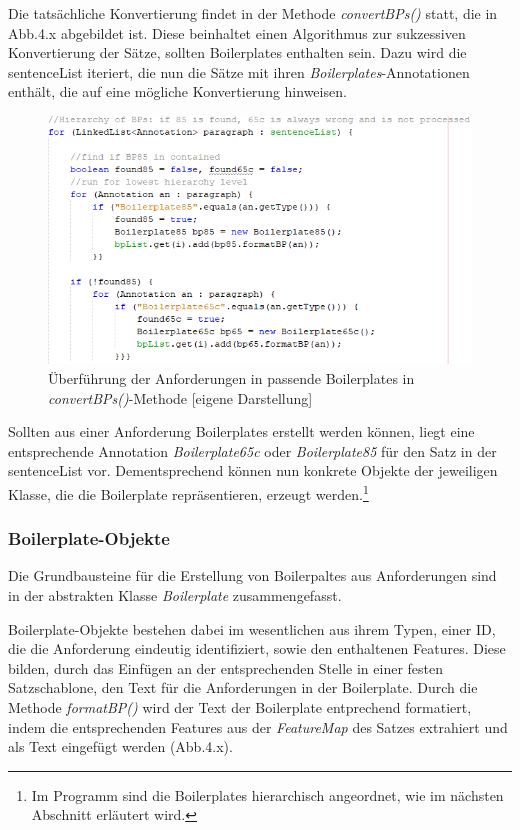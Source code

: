 \documentclass[12pt]{report}
\begin{document}
Die tatsächliche Konvertierung findet in der Methode \textit{convertBPs()} statt, die in Abb.4.x abgebildet ist.  Diese beinhaltet einen Algorithmus zur sukzessiven Konvertierung der Sätze, sollten Boilerplates enthalten sein. Dazu wird die sentenceList iteriert, die nun die Sätze mit ihren \textit{Boilerplates}-Annotationen enthält, die auf eine mögliche Konvertierung hinweisen. 

\begin{figure}[h!]
\begin{center}
\includegraphics[scale=1]{Bilder/BoilerplateHandler-convertBPs.png}
\caption{Überführung der Anforderungen in passende Boilerplates in \textit{convertBPs()}-Methode [eigene Darstellung]}
\end{center}
\end{figure}

Sollten aus einer Anforderung Boilerplates erstellt werden können, liegt eine entsprechende Annotation \textit{Boilerplate65c} oder \textit{Boilerplate85} für den Satz in der sentenceList vor. Dementsprechend können nun konkrete Objekte der jeweiligen Klasse, die die Boilerplate repräsentieren, erzeugt werden.\footnote{Im Programm sind die Boilerplates hierarchisch angeordnet, wie im nächsten Abschnitt erläutert wird.} 



\subsubsection{Boilerplate-Objekte}
Die Grundbausteine für die Erstellung von Boilerpaltes aus Anforderungen sind in der abstrakten Klasse \textit{Boilerplate} zusammengefasst.

Boilerplate-Objekte bestehen dabei im wesentlichen aus ihrem Typen, einer ID, die die Anforderung eindeutig identifiziert, sowie den enthaltenen Features. Diese bilden, durch das Einfügen an der entsprechenden Stelle in einer festen Satzschablone, den Text für die Anforderungen in der Boilerplate. Durch die Methode \textit{formatBP()} wird der Text der Boilerplate entprechend formatiert, indem die entsprechenden Features aus der \textit{FeatureMap} des Satzes extrahiert und als Text eingefügt werden (Abb.4.x). 
\end{document}
